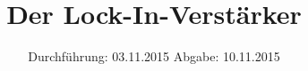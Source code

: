 

\subject{Versuch 303}
\title{Der Lock-In-Verstärker}
\date{
  Durchführung: 03.11.2015
  \hspace{3em}
  Abgabe: 10.11.2015
}



\maketitle
\thispagestyle{empty}

\tableofcontents
\newpage



\newpage

\newpage

\newpage

\newpage
\nocite{*}
\printbibliography


